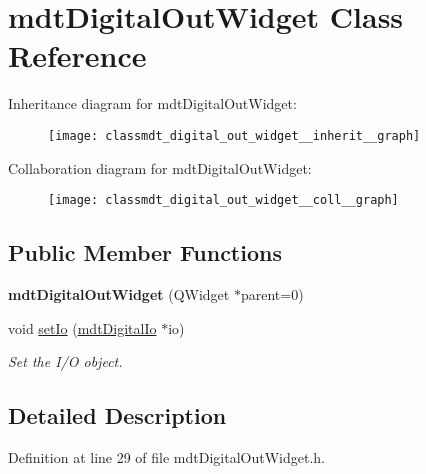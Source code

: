 \hypertarget{classmdt_digital_out_widget}{
\section{mdtDigitalOutWidget Class Reference}
\label{classmdt_digital_out_widget}
}


Inheritance diagram for mdtDigitalOutWidget:\nopagebreak
\begin{figure}[H]
\begin{center}
\leavevmode
\texttt{[image: classmdt\_digital\_out\_widget\_\_inherit\_\_graph]}
\end{center}
\end{figure}


Collaboration diagram for mdtDigitalOutWidget:
\nopagebreak
\begin{figure}[H]
\begin{center}
\leavevmode
\texttt{[image: classmdt\_digital\_out\_widget\_\_coll\_\_graph]}
\end{center}
\end{figure}
\subsection*{Public Member Functions}
\begin{DoxyCompactItemize}
\item 
\hypertarget{classmdt_digital_out_widget_a71a1e8b0eb39b51bce4d3df49293fb89}{
{\bfseries mdtDigitalOutWidget} (QWidget $\ast$parent=0)}
\label{classmdt_digital_out_widget_a71a1e8b0eb39b51bce4d3df49293fb89}

\item 
void \hyperlink{classmdt_digital_out_widget_a3c6f8df089e3a2527d43d1f0a1fad61c}{setIo} (\hyperlink{classmdt_digital_io}{mdtDigitalIo} $\ast$io)
\begin{DoxyCompactList}\small\item\em Set the I/O object. \end{DoxyCompactList}\end{DoxyCompactItemize}


\subsection{Detailed Description}


Definition at line 29 of file mdtDigitalOutWidget.h.



